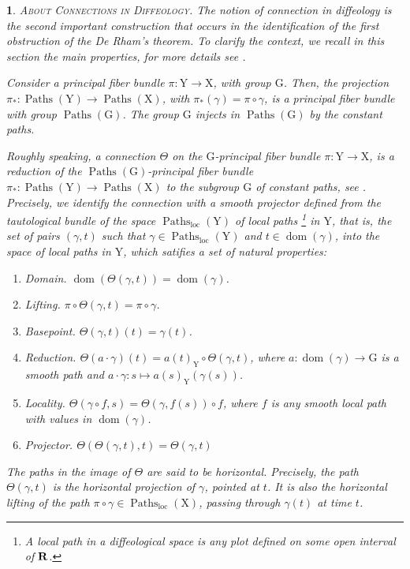 \documentclass[12pt,reqno]{amsart}
\theoremstyle{article}
\newtheorem{article}{}
\def\artlabel[#1]{\textsc{#1}.}
\def \G{\mathrm G}
\def \X{\mathrm X}
\def \Y{\mathrm Y}
\newcommand{\RR}{{\bf R}}
\DeclareMathOperator{\dom}{dom}
\newcommand{\loc}{\text{loc}}
\DeclareMathOperator{\Paths}{Paths}
\begin{document}
  \begin{article}\artlabel[About Connections in Diffeology]
    The notion of connection in diffeology \cite{Igl85} is the second important construction that occurs in the identification of the first obstruction of the De Rham's theorem.
    To clarify the context,
    we recall in this section the main properties,
    for more details see \cite[]{PIZ13}.
    
    Consider a principal fiber bundle $\pi \colon \Y \to \X$,
    with group $\G$.
    Then,
    the projection $\pi_* \colon \Paths(\Y) \to \Paths(\X)$,
    with $\pi_*(\gamma) = \pi \circ \gamma$,
    is a principal fiber bundle with group $\Paths(\G)$.
    The group $\G$ injects in $\Paths(\G)$ by the constant paths.
    
    Roughly speaking,
    a connection $\Theta$ on the $\G$-principal fiber bundle $\pi \colon \Y \to \X$,
    is a reduction of the $\Paths(\G)$-principal fiber bundle $\pi_* \colon \Paths(\Y) \to \Paths(\X)$ to the subgroup $\G$ of constant paths,
    see \cite[A5.1(4) \& A5.2(1)]{Igl85}.
    Precisely,
    we identify the connection with a smooth projector defined from the tautological bundle of the space $\Paths_\loc(\Y)$ of local paths%
    \footnote{A local path in a diffeological space is any plot defined on some open interval of $\RR$.}
    in $\Y$,
    that is,
    the set of pairs $(\gamma,t)$ such that $\gamma \in \Paths_\loc(\Y)$ and $t \in \dom(\gamma)$,
    into the space of local paths in $\Y$,
    which satifies a set of natural properties:
    \begin{enumerate}
      \item[1.] \emph{Domain}. $\dom(\Theta(\gamma,t)) = \dom(\gamma)$.
      \item[2.] \emph{Lifting}. $\pi \circ \Theta(\gamma,t) = \pi \circ \gamma$.
      \item[3.] \emph{Basepoint}. $\Theta(\gamma,t)(t) = \gamma(t)$.
      \item[4.] \emph{Reduction}. $\Theta(a \cdot \gamma)(t) = a(t)_\Y \circ \Theta(\gamma,t)$,
      where $a \colon \dom(\gamma) \to \G$ is a smooth path and $a \cdot \gamma \colon s \mapsto a(s)_\Y(\gamma(s))$.
      \item[5.] \emph{Locality}. $\Theta(\gamma \circ f,s) = \Theta(\gamma, f(s)) \circ f$,
      where $f$ is any smooth local path with values in $\dom(\gamma)$.
      \item[6.] \emph{Projector}. $\Theta(\Theta(\gamma,t),t) = \Theta(\gamma,t)$
    \end{enumerate}
    The paths in the image of $\Theta$ are said to be \emph{horizontal}.
    Precisely,
    the path $\Theta(\gamma,t)$ is the \emph{horizontal projection} of $\gamma$,
    pointed at $t$.
    It is also the \emph{horizontal lifting} of the path $\pi \circ \gamma \in \Paths_\loc(\X)$,
    passing through $\gamma(t)$ at time $t$.
    

\end{article}
\end{document}
